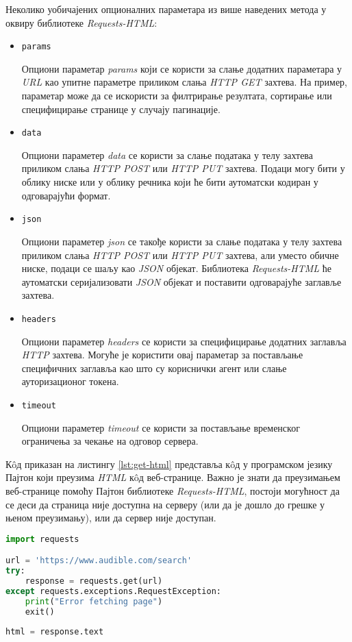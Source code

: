 \documentclass[12pt,oneside]{memoir}
\begin{document}
Неколико уобичајених опционалних параметара из више наведених метода у оквиру библиотеке \textit{Requests-HTML}:
\begin{itemize}
    \item \begin{verbatim}params\end{verbatim} 
        Опциони параметар \textit{params} који се користи за слање додатних параметара у \textit{URL} као упитне параметре приликом слања \textit{HTTP GET} захтева. На пример, параметар може да се искористи за филтрирање резултата, сортирање или специфицирање странице у случају пагинације. 
    \item \begin{verbatim}data\end{verbatim} 
        Опциони параметер \textit{data} се користи за слање података у телу захтева приликом слања \textit{HTTP POST} или \textit{HTTP PUT} захтева. Подаци могу бити у облику ниске или у облику речника који ће бити аутоматски кодиран у одговарајући формат.
    \item \begin{verbatim}json\end{verbatim} 
        Опциони параметер \textit{json} се такође користи за слање података у телу захтева приликом слања \textit{HTTP POST} или \textit{HTTP PUT} захтева, али уместо обичне ниске, подаци се шаљу као \textit{JSON} објекат. Библиотека  \textit{Requests-HTML} ће аутоматски серијализовати \textit{JSON} објекат и поставити одговарајуће заглавље захтева.
    \item \begin{verbatim}headers\end{verbatim} 
        Опциони параметер \textit{headers} се користи за специфицирање додатних заглавља \textit{HTTP} захтева. Могуће је користити овај параметар за постављање специфичних заглавља као што су кориснички агент или слање ауторизационог токена.
    \item \begin{verbatim}timeout\end{verbatim} 
        Опциони параметер \textit{timeout} се користи за постављање временског ограничења за чекање на одговор сервера.
\end{itemize}

Кôд приказан на листингу \ref{lst:get-html} представља кôд у програмском језику Пајтон који преузима \textit{HTML} кôд веб-странице. Важно је знати да преузимањем веб-странице помоћу Пајтон библиотеке \textit{Requests-HTML}, постоји могућност да се деси да страница није доступна на серверу (или да је дошло до грешке у њеном преузимању), или да сервер није доступан.
\begin{lstlisting}[language=Python, caption={Прикупљање \textit{HTML} кода веб-странице}, label={lst:get-html}]
import requests

url = 'https://www.audible.com/search'
try: 
    response = requests.get(url) 
except requests.exceptions.RequestException:
    print("Error fetching page")
    exit()    
    
html = response.text
\end{lstlisting}
\end{document}
